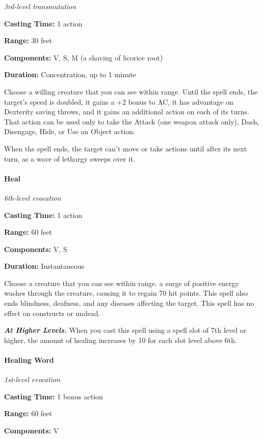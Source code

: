 \documentclass[
]{article}
\begin{document}
\emph{3rd-level transmutation}

\textbf{Casting Time:} 1 action

\textbf{Range:} 30 feet

\textbf{Components:} V, S, M (a shaving of licorice root)

\textbf{Duration:} Concentration, up to 1 minute

Choose a willing creature that you can see within range. Until the spell
ends, the target's speed is doubled, it gains a +2 bonus to AC, it has
advantage on Dexterity saving throws, and it gains an additional action
on each of its turns. That action can be used only to take the Attack
(one weapon attack only), Dash, Disengage, Hide, or Use an Object
action.

When the spell ends, the target can't move or take actions until after
its next turn, as a wave of lethargy sweeps over it.

\hypertarget{heal}{%
\paragraph{Heal}\label{heal}}

\emph{6th-level evocation}

\textbf{Casting Time:} 1 action

\textbf{Range:} 60 feet

\textbf{Components:} V, S

\textbf{Duration:} Instantaneous

Choose a creature that you can see within range. a surge of positive
energy washes through the creature, causing it to regain 70 hit points.
This spell also ends blindness, deafness, and any diseases affecting the
target. This spell has no effect on constructs or undead.

\emph{\textbf{At Higher Levels.}} When you cast this spell using a spell
slot of 7th level or higher, the amount of healing increases by 10 for
each slot level above 6th.

\hypertarget{healing-word}{%
\paragraph{Healing Word}\label{healing-word}}

\emph{1st-level evocation}

\textbf{Casting Time:} 1 bonus action

\textbf{Range:} 60 feet

\textbf{Components:} V
\end{document}
